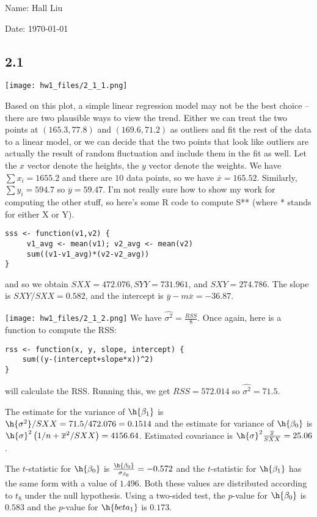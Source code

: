 \documentclass{article}
\newcommand{\conj}{\overline}
\begin{document}
Name: Hall Liu

Date: \today 
\vspace{1.5cm}

\subsection*{2.1}
\texttt{[image: hw1\_files/2\_1\_1.png]}

Based on this plot, a simple linear regression model may not be the best choice -- there are two plausible ways to view the trend. Either we can treat the two points at $(165.3,77.8)$ and $(169.6,71.2)$ as outliers and fit the rest of the data to a linear model, or we can decide that the two points that look like outliers are actually the result of random fluctuation and include them in the fit as well.
Let the $x$ vector denote the heights, the $y$ vector denote the weights. We have $\sum x_i=1655.2$ and there are $10$ data points, so we have $\conj{x}=165.52$. Similarly, $\sum y_i=594.7$ so $\conj{y}=59.47$. I'm not really sure how to show my work for computing the other stuff, so here's some R code to compute S** (where * stands for either X or Y).
\begin{verbatim}
sss <- function(v1,v2) {
     v1_avg <- mean(v1); v2_avg <- mean(v2)
     sum((v1-v1_avg)*(v2-v2_avg))
}
\end{verbatim}

and so we obtain $SXX=472.076,SYY=731.961$, and $SXY=274.786$.
The slope is $SXY/SXX=0.582$, and the intercept is $\conj{y}-m\conj{x}=-36.87$. 

\texttt{[image: hw1\_files/2\_1\_2.png]}
We have $\widehat{\sigma^2}=\frac{RSS}{8}$. Once again, here is a function to compute the RSS:
\begin{verbatim}
rss <- function(x, y, slope, intercept) {
    sum((y-(intercept+slope*x))^2)
}
\end{verbatim}
will calculate the RSS. Running this, we get $RSS=572.014$ so $\widehat{\sigma^2}=71.5$.

The estimate for the variance of $\h{\beta_1}$ is $\h{\sigma^2}/SXX=71.5/472.076=0.1514$ and the estimate for variance of $\h{\beta_0}$ is $\h{\sigma}^2\left(1/n+\conj{x}^2/SXX\right)=4156.64$. Estimated covariance is $\h{\sigma}^2\frac{\conj{x}}{SXX}=25.06$.

The $t$-statistic for $\h{\beta_0}$ is $\frac{\h{\beta_0}}{\sigma_{\beta_0}}=-0.572$ and the $t$-statistic for $\h{\beta_1}$ has the same form with a value of $1.496$. Both these values are distributed according to $t_8$ under the null hypothesis. Using a two-sided test, the $p$-value for $\h{\beta_0}$ is $0.583$ and the $p$-value for $\h{beta_1}$ is $0.173$.
\end{document}
